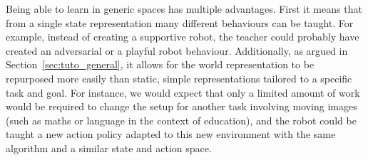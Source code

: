 Being able to learn in generic spaces has multiple advantages. First it means that from a single state representation many different behaviours can be taught. For example, instead of creating a supportive robot, the teacher could probably have created an adversarial or a playful robot behaviour. Additionally, as argued in Section~\ref{sec:tuto_general}, it allows for the world representation to be repurposed more easily than static, simple representations tailored to a specific task and goal. For instance, we would expect that only a limited amount of work would be required to change the setup for another task involving moving images (such as maths or language in the context of education), and the robot could be taught a new action policy adapted to this new environment with the same algorithm and a similar state and action space. 








